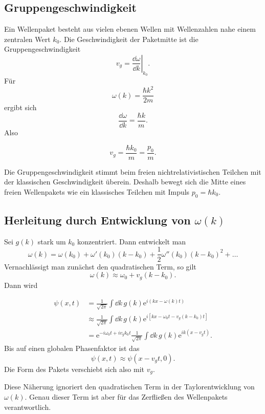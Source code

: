 \subsection{Gruppengeschwindigkeit}

Ein Wellenpaket besteht aus vielen ebenen Wellen mit Wellenzahlen nahe einem zentralen Wert $k_0$. Die Geschwindigkeit der Paketmitte ist die Gruppengeschwindigkeit
\[
    v_g=\left.\frac{\dd\omega}{\dd k}\right|_{k_0}.
\]
Für
\[
    \omega(k)=\frac{\hbar k^2}{2m}
\]
ergibt sich
\[
    \frac{\dd\omega}{\dd k}=\frac{\hbar k}{m}.
\]
Also
\begin{formulabox}
\[
    v_g=\frac{\hbar k_0}{m}=\frac{p_0}{m}.
\]
\end{formulabox}

\begin{conceptbox}
Die Gruppengeschwindigkeit stimmt beim freien nichtrelativistischen Teilchen mit der klassischen Geschwindigkeit überein. Deshalb bewegt sich die Mitte eines freien Wellenpakets wie ein klassisches Teilchen mit Impuls $p_0=\hbar k_0$.
\end{conceptbox}

\subsection{Herleitung durch Entwicklung von $\omega(k)$}

Sei $g(k)$ stark um $k_0$ konzentriert. Dann entwickelt man
\[
    \omega(k)=\omega(k_0)+\omega'(k_0)(k-k_0)+\frac{1}{2}\omega''(k_0)(k-k_0)^2+\dots
\]
Vernachlässigt man zunächst den quadratischen Term, so gilt
\[
    \omega(k)\approx \omega_0+v_g(k-k_0).
\]
Dann wird
\begin{derivationbox}
\[
\begin{aligned}
    \psi(x,t)
    &=\frac{1}{\sqrt{2\pi}}\int\dd k\,
      g(k)\mathrm{e}^{i(kx-\omega(k)t)} \\
    &\approx \frac{1}{\sqrt{2\pi}}\int\dd k\,
      g(k)\mathrm{e}^{i[kx-\omega_0t-v_g(k-k_0)t]} \\
    &=\mathrm{e}^{-i\omega_0t+i v_g k_0 t}
      \frac{1}{\sqrt{2\pi}}\int\dd k\,
      g(k)\mathrm{e}^{ik(x-v_gt)}.
\end{aligned}
\]
Bis auf einen globalen Phasenfaktor ist das
\[
    \psi(x,t)\approx \psi(x-v_gt,0).
\]
Die Form des Pakets verschiebt sich also mit $v_g$.
\end{derivationbox}

\begin{notebox}
Diese Näherung ignoriert den quadratischen Term in der Taylorentwicklung von $\omega(k)$. Genau dieser Term ist aber für das Zerfließen des Wellenpakets verantwortlich.
\end{notebox}

